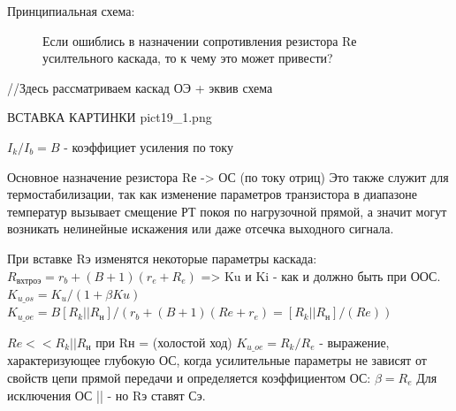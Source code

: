 \documentclass[12pt,a4paper]{article}
\begin{document}
Принципиальная схема:
\begin{center}
        \begin{figure}[h!]
                \caption{Если ошиблись в назначении сопротивления резистора Rе усилтельного каскада, то к чему это может привести?}
        \end{figure}
\end{center}

//Здесь рассматриваем каскад ОЭ + эквив схема

ВСТАВКА КАРТИНКИ pict19_1.png

$I_k/I_b=B$ - коэффициет усиления по току

Основное назначение резистора Rе -> ОС (по току отриц)
Это также служит для термостабилизации, так как изменение параметров транзистора в диапазоне температур вызывает смещение РТ покоя по нагрузочной прямой, а значит могут возникать нелинейные искажения или даже отсечка выходного сигнала.

При вставке Rэ изменятся некоторые параметры каскада:
$R_\textit{вхтроэ}=r_b+(B+1)(r_e+R_e)$
=> \downarrow Ku и \downarrow Ki - как и должно быть при ООС.
$K_\textit{u_os} = K_u/(1+\beta Ku)$
$K_\textit{u_oe} = B[R_k||R_н]/(r_b+(B+1)(Re+r_e) = [R_k||R_н]/(Re))$

$Re << R_k||R_н$
при Rн = \infty (холостой ход)  $K_\textit{u_oe} = R_k/R_e$ - выражение, характеризующее глубокую ОС, когда усилительные параметры не зависят от свойств цепи прямой передачи и определяется коэффициентом ОС: $\beta = R_e$
Для исключения ОС || - но Rэ ставят Сэ.
\end{document}
